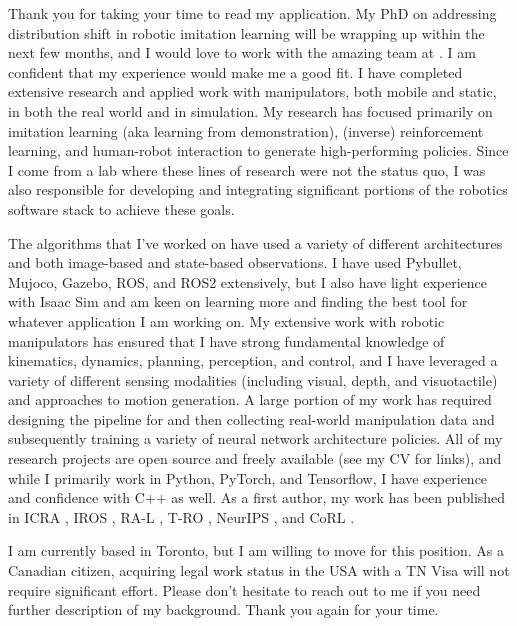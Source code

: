 Thank you for taking your time to read my application. 
My PhD on addressing distribution shift in robotic imitation learning will be wrapping up within the next few months, and I would love to work with the amazing team at \company. 
I am confident that my experience would make me a good fit. 
I have completed extensive research and applied work with manipulators, both mobile and static, in both the real world and in simulation. 
My research has focused primarily on imitation learning (aka learning from demonstration), (inverse) reinforcement learning, and human-robot interaction to generate high-performing policies.
Since I come from a lab where these lines of research were not the status quo, I was also responsible for developing and integrating significant portions of the robotics software stack to achieve these goals.

The algorithms that I’ve worked on have used a variety of different architectures and both image-based and state-based observations. 
I have used Pybullet, Mujoco, Gazebo, ROS, and ROS2 extensively, but I also have light experience with Isaac Sim and am keen on learning more and finding the best tool for whatever application I am working on.
My extensive work with robotic manipulators has ensured that I have strong fundamental knowledge of kinematics, dynamics, planning, perception, and control, and I have leveraged a variety of different sensing modalities (including visual, depth, and visuotactile) and approaches to motion generation.
A large portion of my work has required designing the pipeline for and then collecting real-world manipulation data and subsequently training a variety of neural network architecture policies.
All of my research projects are open source and freely available (see my CV for links), and while I primarily work in Python, PyTorch, and Tensorflow, I have experience and confidence with C++ as well.
As a first author, my work has been published in ICRA \cite{2024_Ablett_vpace}, IROS \cite{ablettSeeingAllAngles2021}, RA-L \cite{2023_Ablett_Learning}, T-RO \cite{2024_Ablett_Push}, NeurIPS \cite{2021_Ablett_Learning}, and CoRL \cite{ablettFastReinforcementLearning2024}.

I am currently based in Toronto, but I am willing to move for this position. 
As a Canadian citizen, acquiring legal work status in the USA with a TN Visa will not require significant effort.
Please don’t hesitate to reach out to me if you need further description of my background. Thank you again for your time.
